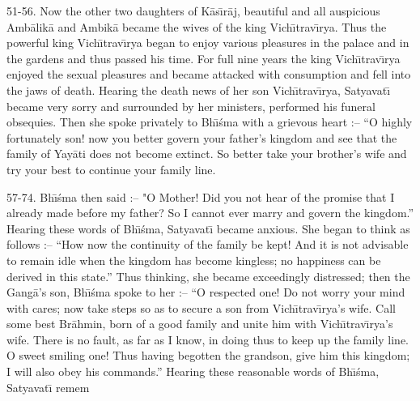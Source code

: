 51-56. Now the other two daughters of K\=as\={\i}r\=aj, beautiful and all auspicious Amb\=alik\=a and Ambik\=a became the wives of the king Vich\={\i}trav\={\i}rya. Thus the powerful king Vich\={\i}trav\={\i}rya began to enjoy various pleasures in the palace and in the gardens and thus passed his time. For full nine years the king Vich\={\i}trav\={\i}rya enjoyed the sexual pleasures and became attacked with consumption and fell into the jaws of death. Hearing the death news of her son Vich\={\i}trav\={\i}rya, Satyavat\={\i} became very sorry and surrounded by her ministers, performed his funeral obsequies. Then she spoke privately to Bh\={\i}\'sma with a grievous heart :-- ``O highly fortunately son! now you better govern your father's kingdom and see that the family of Yay\=ati does not become extinct. So better take your brother's wife and try your best to continue your family line.

57-74. Bh\={\i}\'sma then said :-- "O Mother! Did you not hear of the promise that I already made before my father? So I cannot ever marry and govern the kingdom.'' Hearing these words of Bh\={\i}\'sma, Satyavat\={\i} became anxious. She began to think as follows :-- ``How now the continuity of the family be kept! And it is not advisable to remain idle when the kingdom has become kingless; no happiness can be derived in this state.'' Thus thinking, she became exceedingly distressed; then the Gang\=a's son, Bh\={\i}\'sma spoke to her :-- ``O respected one! Do not worry your mind with cares; now take steps so as to secure a son from Vich\={\i}trav\={\i}rya's wife. Call some best Br\=ahmin, born of a good family and unite him with Vich\={\i}trav\={\i}rya's wife. There is no fault, as far as I know, in doing thus to keep up the family line. O sweet smiling one! Thus having begotten the grandson, give him this kingdom; I will also obey his commands.'' Hearing these reasonable words of Bh\={\i}\'sma, Satyavat\={\i} remem

